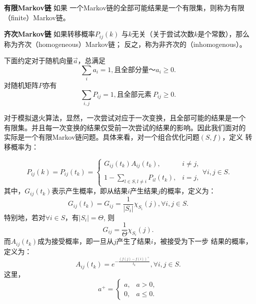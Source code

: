 \begin{definition}{\hei \bf 有限Markov链} 如果
  一个Markov链的全部可能结果是一个有限集，则称为有限（finite）Markov链。
\end{definition}

\begin{definition}{\hei \bf 齐次Markov链} 如果转移概率$P_{ij}(k)$
  与$k$无关（关于尝试次数$k$是个常数），那么称为齐次（homogeneous）Markov链；
  反之，称为非齐次的（inhomogenous）。
\end{definition}

下面约定对于随机向量$\vec{a}$，总满足
\begin{equation}
  \sum_i a_i = 1, \mbox{且全部分量}～a_i \geq 0.
\end{equation}
对随机矩阵$P$亦有
\begin{equation}
  \sum_{i, j}P_{ij} = 1, \mbox{且全部元素}~P_{ij} \geq 0.
\end{equation}

对于模拟退火算法，显然，一次尝试对应于一次变换，且全部可能的结果是一个
有限集。并且每一次变换的结果仅受前一次尝试的结果的影响。因此我们面对的
实际是一个有限Markov链问题。具体来看，对一个组合优化问题$(S, f)$，定义
转移概率为：

\begin{equation}
  P_{ij}(k) = P_{ij}(t_k) = \left\{
  \begin{array}{ll}
    \displaystyle G_{ij}(t_k)A_{ij}(t_k), &i \neq j,\\\\
    \displaystyle 1 - \sum_{l \in S, l \neq i} P_{il}(t_k), &i = j,
  \end{array}  
  \right. \forall i, j \in S.
\end{equation}
其中，$G_{ij}(t_k)$表示产生概率，即从结果$i$产生结果$j$的概率，定义为：
\begin{equation}
  G_{ij}(t_k) = G_{ij} = \frac{1}{|S_i|}\chi_{S_i}(j), \forall i, j \in S.
\end{equation}
特别地，若对$\forall i \in S$，有$|S_i| = \Theta$, 则
\begin{equation}
  G_{ij} = \frac{1}{\Theta} \chi_{S_i}(j).
\end{equation}
而$A_{ij}(t_k)$成为接受概率，即一旦从$j$产生了结果$i$，被接受为下一步
结果的概率，定义为：
\begin{equation}
  A_{ij}(t_k) = e^{-\frac{(f(j) - f(i))^+}{t_k}}, \forall i, j \in S.
\end{equation}
这里，
\begin{equation}
  a^+ = \left\{
  \begin{array}{ll}
    a, & a > 0,\\
    0, & a \leq 0.
  \end{array}
  \right.
\end{equation}

